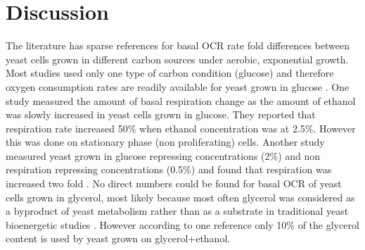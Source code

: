 \section{Discussion}
The literature has sparse references for basal OCR rate fold differences between yeast cells grown in different carbon sources under aerobic, exponential growth. Most studies used only one type of carbon condition (glucose) and therefore oxygen consumption rates are readily available for yeast grown in glucose \cite{meyenburg_energetics_1969}. One study measured the amount of basal respiration change as the amount of ethanol was slowly increased in yeast cells grown in glucose. They reported that respiration rate increased 50\% when ethanol concentration was at 2.5\%. However this was done on stationary phase (non proliferating) cells. Another study measured yeast grown in glucose repressing concentrations (2\%) and non respiration repressing concentrations (0.5\%) and found that respiration was increased two fold \cite{lin_calorie_2002}. No direct numbers could be found for basal OCR of yeast cells grown in glycerol, most likely because most often glycerol was considered as a byproduct of yeast metabolism rather than as a substrate in traditional yeast bioenergetic studies \cite{gancedo_glycerol_1968,wills_regulation_1990}. However according to one reference \cite{christopher_wills_effect_1984} only 10\% of the glycerol content is used by yeast grown on glycerol+ethanol. 

